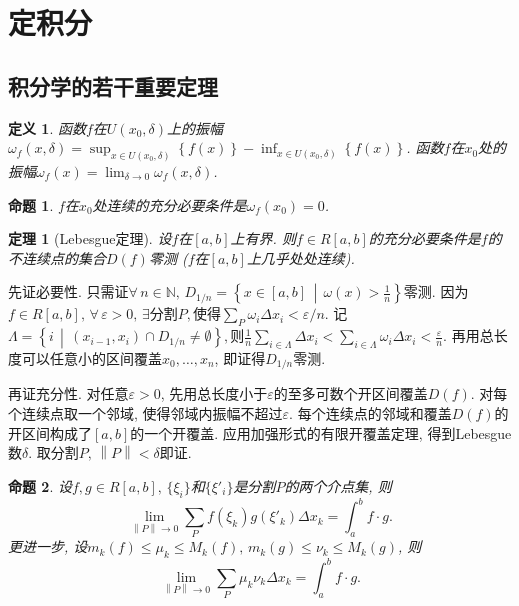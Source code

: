 \documentclass[11pt,a4paper]{ctexart}
\makeatletter
\theoremstyle{thmseries} %
\newtheorem{thm}{定理}[section]
\newtheorem{prop}{命题}[section]
\theoremstyle{exerseries}
\newtheorem{defn}{定义}[section]
\renewenvironment{proof}[1][\proofname]{\par
  \pushQED{\qed}%
  \normalfont \topsep6\p@\@plus6\p@\relax
  \trivlist
  \item[\hskip\labelsep
        \itshape
    #1\@addpunct{}]\ignorespaces
}{%
  \popQED\endtrivlist\@endpefalse
}
\newenvironment{pf}{\begin{proof}[\bfseries\upshape 证\quad]}{\end{proof}}
\newcommand{\cbra}[1]{\mathopen{}\left\{#1\right\}}
\newcommand{\norm}[1]{\left\lVert #1 \right\rVert}
\renewcommand{\epsilon}{\varepsilon}
\newcommand{\N}{\mathbb{N}}
\renewcommand{\d}{\mathrm{d}}
\makeatother
\begin{document}
\section{定积分}
\subsection{积分学的若干重要定理}
\begin{defn}
	函数$f$在$U(x_0,\delta)$上的振幅$\omega_f(x,\delta)=\sup_{x\in U(x_0,\delta)}\cbra{f(x)}-\inf_{x\in U(x_0,\delta)}\cbra{f(x)}$. 函数$f$在$x_0$处的振幅$\omega_f(x)=\lim_{\delta\to 0}\omega_f(x,\delta)$. 
\end{defn}

\begin{prop}
	$f$在$x_0$处连续的充分必要条件是$\omega_f(x_0)=0$. 
\end{prop}

\begin{thm}[Lebesgue定理]
	设$f$在$[a,b]$上有界. 则$f\in R[a,b]$的充分必要条件是$f$的不连续点的集合$D(f)$零测 ($f$在$[a,b]$上几乎处处连续). 
\end{thm}
\begin{pf}
	\everymath{\textstyle}
	先证必要性. 只需证$\forall\,n\in\N,\,D_{1/n}=\cbra{x\in[a,b]\,\middle\vert\,\omega(x)>\frac{1}{n}}$零测. 因为$f\in R[a,b],\,\forall\,\epsilon>0,\,\exists$分割$P,$使得$\sum_P\omega_i\Delta x_i<\epsilon/n$. 记$\Lambda=\cbra{i\,\middle\vert\,(x_{i-1},x_i)\cap D_{1/n}\neq\emptyset},$则$\frac{1}{n}\sum_{i\in\Lambda}\Delta x_i<\sum_{i\in\Lambda}\omega_i\Delta x_i<\frac{\epsilon}{n}$. 再用总长度可以任意小的区间覆盖$x_0,\dots,x_n$, 即证得$D_{1/n}$零测. 

	再证充分性. 对任意$\epsilon>0$, 先用总长度小于$\epsilon$的至多可数个开区间覆盖$D(f)$. 对每个连续点取一个邻域, 使得邻域内振幅不超过$\epsilon$. 每个连续点的邻域和覆盖$D(f)$的开区间构成了$[a,b]$的一个开覆盖. 应用加强形式的有限开覆盖定理, 得到Lebesgue数$\delta$. 取分割$P,\,\norm{P}<\delta$即证. 
\end{pf}


\begin{prop}
	设$f,g\in R[a,b],\,\{\xi_i\}$和$\{\xi'_i\}$是分割$P$的两个介点集, 则
	\[\lim_{\norm{P}\to0}\sum_P f(\xi_k)g(\xi'_k)\Delta x_k=\int_{a}^{b}f\cdot g.\]
	更进一步, 设$m_k(f)\leq\mu_k\leq M_k(f),\,m_k(g)\leq\nu_k\leq M_k(g)$, 则
	\[\lim_{\norm{P}\to0}\sum_P \mu_k\nu_k\Delta x_k=\int_{a}^{b}f\cdot g.\]
\end{prop}
\end{document}
